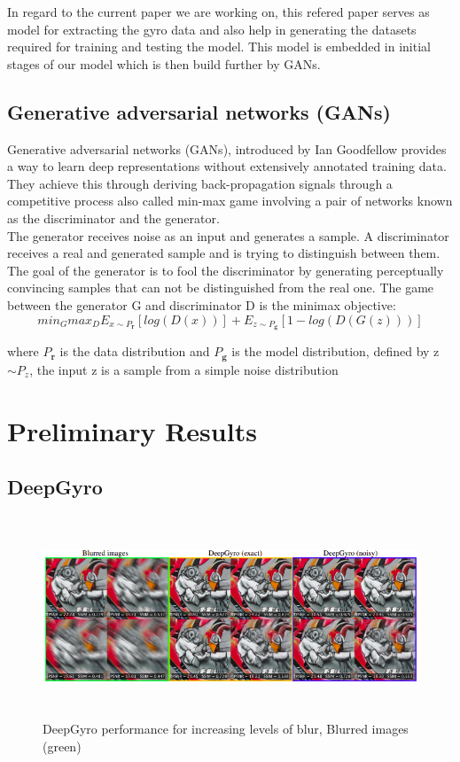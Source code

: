 \documentclass[10pt,twocolumn,letterpaper]{article}
\begin{document}
In regard to the current paper we are working on, this refered paper serves as model for extracting the gyro data and also  help in generating the datasets required for training and testing the model. This model is embedded in initial stages of our model which is then build further by GANs.

\subsection{Generative adversarial networks (GANs)}
Generative adversarial networks (GANs), introduced by Ian Goodfellow provides a way to learn deep representations without extensively annotated training data. They achieve this through deriving back-propagation signals through a competitive process also called min-max game involving a pair of networks known as the discriminator and the generator. 
\\

The generator receives noise as an input and generates a sample. A discriminator receives a real and generated sample and is trying to distinguish between them. The goal of the generator is to fool the discriminator by generating perceptually convincing samples that can not be distinguished from the real one. The game between the generator G and discriminator D is the minimax objective:
\begin{equation}
min_{G} max_{D} E_{x \sim P_{\textbf{r}}}[log(D(x))] + E_{z \sim P_{\textbf{g}}}[1 - log(D(G(z)))]
\end{equation}\textbf{}

where $P_{\textbf{r}}$ is the data distribution and $P_{\textbf{g}}$ is the model distribution, defined by z $\sim P_{z}$, the input z is a sample from a simple noise distribution

\section{Preliminary Results}
\label{sec:prelim_results}
\subsection{DeepGyro}
\vspace{-0.5cm}
\begin{figure}[h]
    \centering
    \includegraphics[width=2.2\columnwidth,height=6cm]{images/deepgyro.png}
    \caption{ DeepGyro performance for increasing levels of blur, Blurred images (green)}
    \label{fig: result_deepgyro}
\end{figure}
\end{document}
